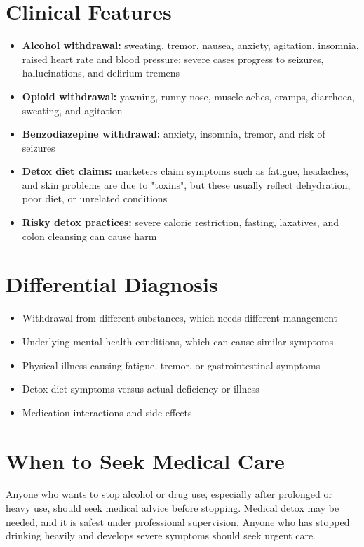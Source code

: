 \section*{Clinical Features}
\begin{itemize}
    \item \textbf{Alcohol withdrawal:} sweating, tremor, nausea, anxiety, agitation, insomnia, raised heart rate and blood pressure; severe cases progress to seizures, hallucinations, and delirium tremens
    \item \textbf{Opioid withdrawal:} yawning, runny nose, muscle aches, cramps, diarrhoea, sweating, and agitation
    \item \textbf{Benzodiazepine withdrawal:} anxiety, insomnia, tremor, and risk of seizures
    \item \textbf{Detox diet claims:} marketers claim symptoms such as fatigue, headaches, and skin problems are due to "toxins", but these usually reflect dehydration, poor diet, or unrelated conditions
    \item \textbf{Risky detox practices:} severe calorie restriction, fasting, laxatives, and colon cleansing can cause harm
\end{itemize}

\section*{Differential Diagnosis}
\begin{itemize}
    \item Withdrawal from different substances, which needs different management
    \item Underlying mental health conditions, which can cause similar symptoms
    \item Physical illness causing fatigue, tremor, or gastrointestinal symptoms
    \item Detox diet symptoms versus actual deficiency or illness
    \item Medication interactions and side effects
\end{itemize}

\section*{When to Seek Medical Care}
Anyone who wants to stop alcohol or drug use, especially after prolonged or heavy use, should seek medical advice before stopping. Medical detox may be needed, and it is safest under professional supervision. Anyone who has stopped drinking heavily and develops severe symptoms should seek urgent care.

